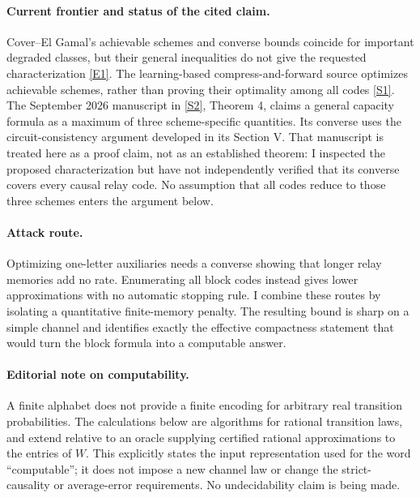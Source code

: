 \documentclass[11pt,a4paper]{article}
\newcommand{\sref}[2]{\hyperlink{source:#1:#2}{[S#2]}}
\newcommand{\eref}[2]{\hyperlink{extra:#1:#2}{[E#2]}}
\numberwithin{equation}{section}
\begin{document}
\paragraph{Current frontier and status of the cited claim.}
Cover--El Gamal's achievable schemes and converse bounds coincide for
important degraded classes, but their general inequalities do not give
the requested characterization \eref{167}{1}. The learning-based
compress-and-forward source optimizes achievable schemes, rather than
proving their optimality among all codes \sref{167}{1}. The September
2026 manuscript in \sref{167}{2}, Theorem 4, claims a general capacity
formula as a maximum of three scheme-specific quantities. Its converse
uses the circuit-consistency argument developed in its Section V.
That manuscript is treated here as a proof claim, not as an established
theorem: I inspected the proposed characterization but have not
independently verified that its converse covers every causal relay code.
No assumption that all codes reduce to those three schemes enters the
argument below.

\paragraph{Attack route.}
Optimizing one-letter auxiliaries needs a converse showing that longer
relay memories add no rate. Enumerating all block codes instead gives
lower approximations with no automatic stopping rule. I combine these
routes by isolating a quantitative finite-memory penalty. The resulting
bound is sharp on a simple channel and identifies exactly the effective
compactness statement that would turn the block formula into a
computable answer.

\paragraph{Editorial note on computability.}
A finite alphabet does not provide a finite encoding for arbitrary real
transition probabilities. The calculations below are algorithms for
rational transition laws, and extend relative to an oracle supplying
certified rational approximations to the entries of $W$. This explicitly
states the input representation used for the word ``computable''; it
does not impose a new channel law or change the strict-causality or
average-error requirements. No undecidability claim is being made.
\end{document}
